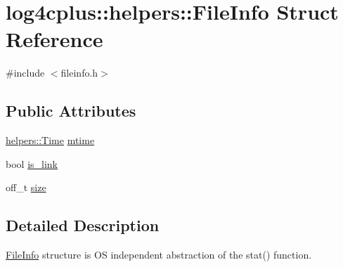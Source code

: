 \hypertarget{structlog4cplus_1_1helpers_1_1FileInfo}{\section{log4cplus\-:\-:helpers\-:\-:File\-Info Struct Reference}
\label{structlog4cplus_1_1helpers_1_1FileInfo}
}


{\ttfamily \#include $<$fileinfo.\-h$>$}

\subsection*{Public Attributes}
\begin{DoxyCompactItemize}
\item 
\hyperlink{namespacelog4cplus_1_1helpers_af05d40c37e1cccf9d11d0cbb7426bcd4}{helpers\-::\-Time} \hyperlink{structlog4cplus_1_1helpers_1_1FileInfo_ab38d3edc9cf37c18859bd7accaaa3b15}{mtime}
\item 
bool \hyperlink{structlog4cplus_1_1helpers_1_1FileInfo_a814940b8abe01c1254f190131462fff2}{is\-\_\-link}
\item 
off\-\_\-t \hyperlink{structlog4cplus_1_1helpers_1_1FileInfo_a9e1c11126890a288319f8983d708fffc}{size}
\end{DoxyCompactItemize}


\subsection{Detailed Description}
\hyperlink{structlog4cplus_1_1helpers_1_1FileInfo}{File\-Info} structure is O\-S independent abstraction of the {\ttfamily stat()} function. 

